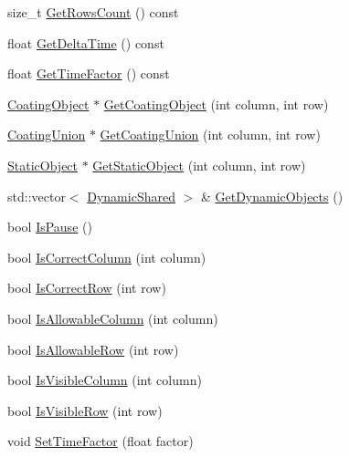 \begin{DoxyCompactItemize}
size\+\_\+t \hyperlink{classrtm_1_1_world_controller_afb245167ac0680db01a3d09f80051dd0}{Get\+Rows\+Count} () const
\item 
float \hyperlink{classrtm_1_1_world_controller_a2288dd191a28070d4811897281413c36}{Get\+Delta\+Time} () const
\item 
float \hyperlink{classrtm_1_1_world_controller_a97ccb5133bc7c0617affe4d947265370}{Get\+Time\+Factor} () const
\item 
\hyperlink{classrtm_1_1_coating_object}{Coating\+Object} $\ast$ \hyperlink{classrtm_1_1_world_controller_ab2b9d9d1451820fcbbe7107deed6e4cf}{Get\+Coating\+Object} (int column, int row)
\item 
\hyperlink{classrtm_1_1_coating_union}{Coating\+Union} $\ast$ \hyperlink{classrtm_1_1_world_controller_ac43dfd6de088ba04aefc8b4d9d118ea7}{Get\+Coating\+Union} (int column, int row)
\item 
\hyperlink{classrtm_1_1_static_object}{Static\+Object} $\ast$ \hyperlink{classrtm_1_1_world_controller_ae949e287815fd3327b04b4225255bcf1}{Get\+Static\+Object} (int column, int row)
\item 
std\+::vector$<$ \hyperlink{namespacertm_af668a936c29b476890a79ad1eb19e3cc}{Dynamic\+Shared} $>$ \& \hyperlink{classrtm_1_1_world_controller_a3f1ea0c4cb853482e4b4681fb14f9b4f}{Get\+Dynamic\+Objects} ()
\item 
bool \hyperlink{classrtm_1_1_world_controller_a028e4f7ab189c6ad5fe889ca375786e4}{Is\+Pause} ()
\item 
bool \hyperlink{classrtm_1_1_world_controller_ae560ff85d296effbe814dbadc2514ccf}{Is\+Correct\+Column} (int column)
\item 
bool \hyperlink{classrtm_1_1_world_controller_ae468c9d0d4de9c4250eea4c78dc9eb7a}{Is\+Correct\+Row} (int row)
\item 
bool \hyperlink{classrtm_1_1_world_controller_aae96f9a5d1a32b4c347fa07a6180f8fd}{Is\+Allowable\+Column} (int column)
\item 
bool \hyperlink{classrtm_1_1_world_controller_a0adbbeed573fe3d987c6db2f14e50d21}{Is\+Allowable\+Row} (int row)
\item 
bool \hyperlink{classrtm_1_1_world_controller_aba0f7dc41fd8b38af0864b05e3c59761}{Is\+Visible\+Column} (int column)
\item 
bool \hyperlink{classrtm_1_1_world_controller_a146a82552c4043987b96615547f527be}{Is\+Visible\+Row} (int row)
\item 
void \hyperlink{classrtm_1_1_world_controller_ae06b54bf542fcd9a30945b6d51048f53}{Set\+Time\+Factor} (float factor)

\end{DoxyCompactItemize}
